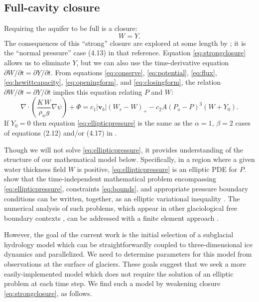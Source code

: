 \documentclass[11pt,final]{amsart}%
\newcommand\bv{\mathbf{v}}
\newcommand{\Div}{\nabla\cdot}
\newcommand{\grad}{\nabla}
\begin{document}
\subsection*{Full-cavity closure}  Requiring the aquifer to be full is a closure:
\begin{equation}
W = Y.\label{eq:strongclosure}
\end{equation}
The consequences of this ``strong'' closure are explored at some length by \cite{Schoofetal2012}; it is the ``normal pressure'' case (4.13) in that reference.  Equation \eqref{eq:strongclosure} allows us to eliminate $Y$, but we can also use the time-derivative equation $\partial W/\partial t = \partial Y/\partial t$.  From equations \eqref{eq:conserve}, \eqref{eq:potential}, \eqref{eq:flux}, \eqref{eq:hewittcapacity}, \eqref{eq:openingform}, and \eqref{eq:closingform}, the relation $\partial W/\partial t = \partial Y/\partial t$ implies this equation relating $P$ and $W$:
\begin{equation}
\Div \left(\frac{K\,W}{\rho_w g} \grad \psi \right) + \Phi = c_1 |\bv_b| (W_r - W)_+ - c_2 A (P_o - P)^3 (W+Y_0).\label{eq:ellipticpressure}
\end{equation}
If $Y_0=0$ then equation \eqref{eq:ellipticpressure} is the same as the $\alpha=1$, $\beta=2$ cases of equations (2.12) and/or (4.17) in \citep{Schoofetal2012}.

Though we will not solve \eqref{eq:ellipticpressure}, it provides understanding of the structure of our mathematical model below.  Specifically, in a region where a given water thickness field $W$ is positive, \eqref{eq:ellipticpressure} is an elliptic PDE for $P$.  \cite{Schoofetal2012} show that the time-independent mathematical problem encompassing \eqref{eq:ellipticpressure}, constraints \eqref{eq:bounds}, and appropriate pressure boundary conditions can be written, together, as an elliptic variational inequality \citep{KinderlehrerStampacchia}.  The numerical analysis of such problems, which appear in other glaciological free boundary contexts \citep{SchoofStream,JouvetBueler2012}, can be addressed with a finite element approach \citep{Ciarlet}.

However, the goal of the current work is the initial selection of a subglacial hydrology model which can be straightforwardly coupled to three-dimensional ice dynamics and parallelized.  We need to determine parameters for this model from observations at the surface of glaciers.  These goals suggest that we seek a more easily-implemented model which does not require the solution of an elliptic problem at each time step.  We find such a model by weakening closure \eqref{eq:strongclosure}, as follows.
\end{document}
